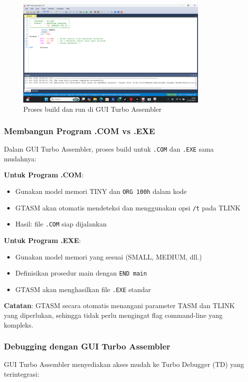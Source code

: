 \documentclass[../main.tex]{subfiles}
\begin{document}
\begin{figure}[H]
    \centering
    \includegraphics[width=0.85\textwidth]{images/gtasm_build_process.png}
    \caption{Proses build dan run di GUI Turbo Assembler}
    \label{fig:gtasm-build-process}
\end{figure}

            \subsubsection{Membangun Program .COM vs .EXE}
Dalam GUI Turbo Assembler, proses build untuk \texttt{.COM} dan \texttt{.EXE} sama mudahnya:

\textbf{Untuk Program .COM}:
\begin{itemize}
    \item Gunakan model memori TINY dan \texttt{ORG 100h} dalam kode
    \item GTASM akan otomatis mendeteksi dan menggunakan opsi \texttt{/t} pada TLINK
    \item Hasil: file \texttt{.COM} siap dijalankan
\end{itemize}

\textbf{Untuk Program .EXE}:
\begin{itemize}
    \item Gunakan model memori yang sesuai (SMALL, MEDIUM, dll.)
    \item Definisikan prosedur main dengan \texttt{END main}
    \item GTASM akan menghasilkan file \texttt{.EXE} standar
\end{itemize}

\textbf{Catatan}: GTASM secara otomatis menangani parameter TASM dan TLINK yang diperlukan, sehingga tidak perlu mengingat flag command-line yang kompleks.

            \subsubsection{Debugging dengan GUI Turbo Assembler}
GUI Turbo Assembler menyediakan akses mudah ke Turbo Debugger (TD) yang terintegrasi:
\end{document}
